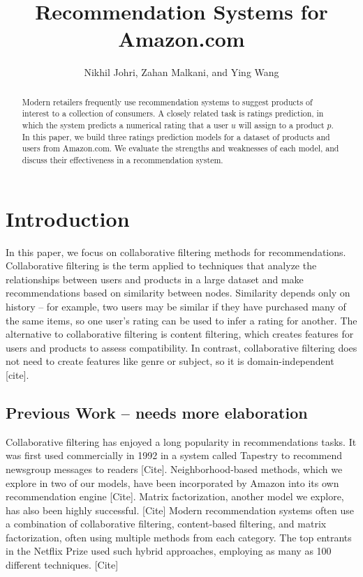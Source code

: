 \documentclass[letterpaper, 10 pt, conference]{ieeeconf}
\title{\LARGE \bf
Recommendation Systems for Amazon.com
}
\author{Nikhil Johri, Zahan Malkani, and Ying Wang
}
\begin{document}
\maketitle
\thispagestyle{empty}
\pagestyle{empty}


\begin{abstract}
Modern retailers frequently use recommendation systems to suggest products of 
interest to a collection of consumers. A closely related task is ratings 
prediction, in which the system predicts a numerical rating that a 
user $u$ will assign to a product $p$. In this paper, we build three ratings 
prediction models for a dataset of products and users from Amazon.com. We 
evaluate the strengths and weaknesses of each model, and discuss their 
effectiveness in a recommendation system.

\end{abstract}

\section{Introduction}
In this paper, we focus on collaborative filtering methods for recommendations. 
Collaborative filtering is the term applied to techniques that analyze the 
relationships between users and products in a large dataset and make 
recommendations based on similarity between nodes. Similarity depends only on
history -- for example, two users may be similar if they have purchased many 
of the same items, so one user's rating can be used to infer a rating for 
another. The alternative to collaborative filtering is content filtering, which 
creates features for users and products to assess compatibility. In contrast, 
collaborative filtering does not need to create features like genre or subject, 
so it is domain-independent [cite]. 

\subsection{Previous Work -- needs more elaboration}
Collaborative filtering has enjoyed a long popularity in recommendations tasks. 
It was first used commercially in 1992 in a system called Tapestry to 
recommend newsgroup messages to readers [Cite]. Neighborhood-based methods, 
which we explore in two of our models, have been incorporated by Amazon into 
its own recommendation engine [Cite]. Matrix factorization, another model we 
explore, has also been highly successful. [Cite] Modern recommendation systems 
often use a combination of collaborative filtering, content-based filtering, 
and matrix factorization, often using multiple methods from each category. 
The top entrants in the Netflix Prize used such hybrid approaches, employing 
as many as 100 different techniques. [Cite]
\end{document}
